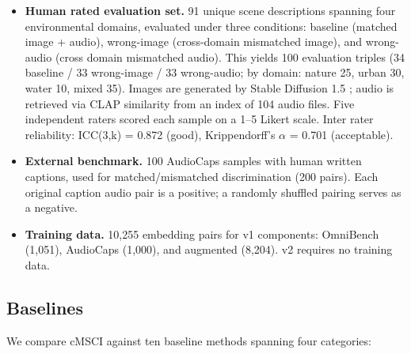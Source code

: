 \documentclass[a4paper,fleqn]{cas-sc}
\begin{document}
\begin{itemize}
\begin{itemize}

\item \textbf{Human rated evaluation set.}
91 unique scene descriptions spanning four environmental domains, evaluated under three conditions: baseline (matched image + audio), wrong-image (cross-domain mismatched image), and wrong-audio (cross domain mismatched audio). This yields 100 evaluation triples (34 baseline / 33 wrong-image / 33 wrong-audio; by domain: nature 25, urban 30, water 10, mixed 35). Images are generated by Stable Diffusion 1.5 \citep{rombach2022high}; audio is retrieved via CLAP similarity from an index of 104 audio files. Five independent raters scored each sample on a 1--5 Likert scale. Inter rater reliability: ICC(3,k) = 0.872 (good), Krippendorff's $\alpha$ = 0.701 (acceptable).

\item \textbf{External benchmark.}
100 AudioCaps samples \citep{kim2019audiocaps} with human written captions, used for matched/mismatched discrimination (200 pairs). Each original caption audio pair is a positive; a randomly shuffled pairing serves as a negative.

\item \textbf{Training data.}
10,255 embedding pairs for v1 components: OmniBench (1,051), AudioCaps (1,000), and augmented (8,204). v2 requires no training data.

\end{itemize}

\subsection{Baselines}\label{sec:baselines}

We compare cMSCI against ten baseline methods spanning four categories:


\end{itemize}
\end{document}

